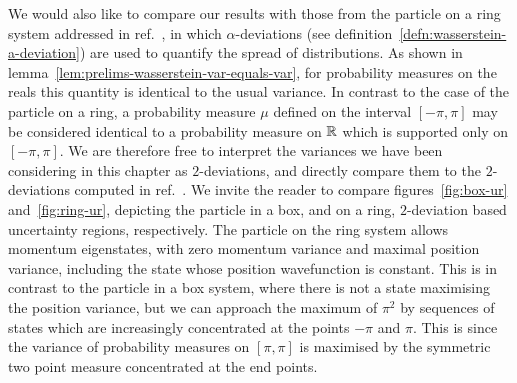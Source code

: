 We would also like to compare our results with those from the particle on a ring system addressed in ref.~\cite{sharp-ur-num-angle}, in which $\alpha$-deviations (see definition~\ref{defn:wasserstein-a-deviation}) are used to quantify the spread of distributions. As shown in lemma~\ref{lem:prelims-wasserstein-var-equals-var}, for probability measures on the reals this quantity is identical to the usual variance. In contrast to the case of the particle on a ring, a probability measure $\mu$ defined on the interval $[-\pi,\pi]$ may be considered identical to a probability measure on $\mathbb{R}$ which is supported only on $[-\pi,\pi]$. 
We are therefore free to interpret the variances we have been considering in this chapter as $2$-deviations, and directly compare them to the $2$-deviations computed in ref.~\cite{sharp-ur-num-angle}. We invite the reader to compare figures~\ref{fig:box-ur} and~\ref{fig:ring-ur}, depicting the particle in a box, and on a ring, $2$-deviation based uncertainty regions, respectively. The particle on the ring system allows momentum eigenstates, with zero momentum variance and maximal position variance, including the state whose position wavefunction is constant. This is in contrast to the particle in a box system, where there is not a state maximising the position variance, but we can approach the maximum of $\pi^2$ by sequences of states which are increasingly concentrated at the points $-\pi$ and $\pi$. This is since the variance of probability measures on $[\pi,\pi]$ is maximised by the symmetric two point measure concentrated at the end points.
